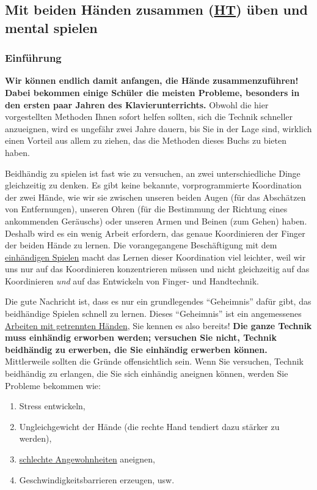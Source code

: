 
\subsection{Mit beiden Händen zusammen (\hyperref[HsHt]{HT}) üben und mental spielen}
\label{c1ii25}

\subsubsection{Einführung}
\label{c1ii25a}

\textbf{Wir können endlich damit anfangen, die Hände zusammenzuführen!
Dabei bekommen einige Schüler die meisten Probleme, besonders in den ersten paar Jahren des Klavierunterrichts.}
Obwohl die hier vorgestellten Methoden Ihnen sofort helfen sollten, sich die Technik schneller anzueignen, wird es ungefähr zwei Jahre dauern, bis Sie in der Lage sind, wirklich einen Vorteil aus allem zu ziehen, das die Methoden dieses Buchs zu bieten haben.

Beidhändig zu spielen ist fast wie zu versuchen, an zwei unterschiedliche Dinge gleichzeitig zu denken.
Es gibt keine bekannte, vorprogrammierte Koordination der zwei Hände, wie wir sie zwischen unseren beiden Augen (für das Abschätzen von Entfernungen), unseren Ohren (für die Bestimmung der Richtung eines ankommenden Geräuschs) oder unseren Armen und Beinen (zum Gehen) haben.
Deshalb wird es ein wenig Arbeit erfordern, das genaue Koordinieren der Finger der beiden Hände zu lernen.
Die vorangegangene Beschäftigung mit dem \hyperref[c1ii7]{einhändigen Spielen} macht das Lernen dieser Koordination viel leichter, weil wir uns nur auf das Koordinieren konzentrieren müssen und nicht gleichzeitig auf das Koordinieren \textit{und} auf das Entwickeln von Finger- und Handtechnik.

Die gute Nachricht ist, dass es nur ein grundlegendes \enquote{Geheimnis} dafür gibt, das beidhändige Spielen schnell zu lernen.
Dieses \enquote{Geheimnis} ist ein angemessenes \hyperref[c1ii7]{Arbeiten mit getrennten Händen}, Sie kennen es also bereits!
\textbf{Die ganze Technik muss einhändig erworben werden;
versuchen Sie nicht, Technik beidhändig zu erwerben, die Sie einhändig erwerben können.}
Mittlerweile sollten die Gründe offensichtlich sein.
Wenn Sie versuchen, Technik beidhändig zu erlangen, die Sie sich einhändig aneignen können, werden Sie Probleme bekommen wie:

\begin{enumerate}[label={\arabic*.}] 
 \item Stress entwickeln,
 \item Ungleichgewicht der Hände (die rechte Hand tendiert dazu stärker zu werden),
 \item \hyperref[c1ii22]{schlechte Angewohnheiten} aneignen,
 \item Geschwindigkeitsbarrieren erzeugen, usw.
\end{enumerate}

